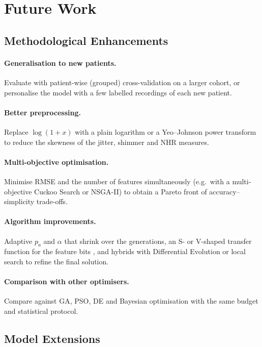 \documentclass[12pt,a4paper]{article}
\numberwithin{equation}{section}
\numberwithin{table}{section}
\numberwithin{figure}{section}
\begin{document}
\section{Future Work}\label{sec:future}

\subsection{Methodological Enhancements}
\paragraph{Generalisation to new patients.} Evaluate with patient-wise (grouped) cross-validation on a larger cohort, or personalise the model with a few labelled recordings of each new patient.

\paragraph{Better preprocessing.} Replace $\log(1+x)$ with a plain logarithm or a Yeo--Johnson power transform to reduce the skewness of the jitter, shimmer and NHR measures.

\paragraph{Multi-objective optimisation.} Minimise RMSE and the number of features simultaneously (e.g.\ with a multi-objective Cuckoo Search or NSGA-II) to obtain a Pareto front of accuracy--simplicity trade-offs.

\paragraph{Algorithm improvements.} Adaptive $p_a$ and $\alpha$ that shrink over the generations, an S- or V-shaped transfer function for the feature bits \cite{mirjalili2013}, and hybrids with Differential Evolution or local search to refine the final solution.

\paragraph{Comparison with other optimisers.} Compare against GA, PSO, DE and Bayesian optimisation with the same budget and statistical protocol.

\subsection{Model Extensions}
\end{document}
